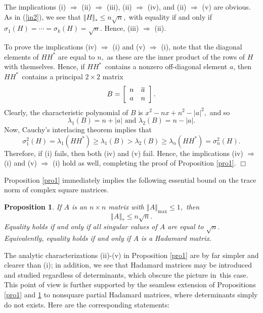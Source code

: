 \documentclass[12pt]{article}%
\newtheorem{proposition}[theorem]{Proposition}
\newenvironment{proof}[1][Proof]{\noindent{\textbf {#1}  }}  {\hfill$\Box$\bigskip}
\begin{document}
\begin{proof}
The implications (i) $\Rightarrow$ (ii) $\Rightarrow$ (iii), (ii)
$\Rightarrow$ (iv), and (ii) $\Rightarrow$ (v) are obvious. As in (\ref{in2}),
we see that $\left\Vert H\right\Vert _{\ast}\leq n\sqrt{n},$ with equality if
and only if $\sigma_{1}\left(  H\right)  =\cdots=\sigma_{k}\left(  H\right)
=\sqrt{n}.$ Hence, (iii) $\Rightarrow$ (ii).

To prove the implications (iv) $\Rightarrow$ (i) and (v) $\Rightarrow$ (i),
note that the diagonal elements of $HH^{\ast}$ are equal to $n,$ as these are
the inner product of the rows of $H$ with themselves. Hence, if $HH^{\ast
\text{ }}$contains a nonzero off-diagonal element $a$, then $HH^{\ast\text{ }%
}$contains a principal $2\times2$ matrix
\[
B=\left[
\begin{array}
[c]{cc}%
n & \overline{a}\\
a & n
\end{array}
\right]  .
\]
Clearly, the characteristic polynomial of $B$ is $x^{2}-nx+n^{2}-\left\vert
a\right\vert ^{2},$ and so
\[
\lambda_{1}\left(  B\right)  =n+\left\vert a\right\vert \text{ and }%
\lambda_{2}\left(  B\right)  =n-\left\vert a\right\vert .
\]
Now, Cauchy's interlacing theorem implies that
\[
\sigma_{1}^{2}\left(  H\right)  =\lambda_{1}\left(  HH^{\ast}\right)
\geq\lambda_{1}\left(  B\right)  >\lambda_{2}\left(  B\right)  \geq\lambda
_{n}\left(  HH^{\ast}\right)  =\sigma_{n}^{2}\left(  H\right)  .
\]
Therefore, if (i) fails, then both (iv) and (v) fail. Hence, the implications
(iv) $\Rightarrow$ (i) and (v) $\Rightarrow$ (i) hold as well, completing the
proof of Proposition \ref{pro1}.
\end{proof}

Proposition \ref{pro1} immediately implies the following essential bound on
the trace norm of complex square matrices.

\begin{proposition}
\label{tHad}If $A$ is an $n\times n$ matrix with $\left\Vert A\right\Vert
_{\max}\leq1,$ then%
\[
\left\Vert A\right\Vert _{\ast}\leq n\sqrt{n}.
\]
Equality holds if and only if all singular values of $A$ are equal to
$\sqrt{n}.$ Equivalently, equality holds if and only if $A$ is a Hadamard matrix.
\end{proposition}

The analytic characterizations (ii)-(v) in Proposition \ref{pro1} are by far
simpler and clearer than (i); in addition, we see that Hadamard matrices may
be introduced and studied regardless of determinants, which obscure the
picture in\ this case. This point of view is further supported by the seamless
extension of Propositions \ref{pro1} and \ref{tHad} to nonsquare partial
Hadamard matrices, where determinants simply do not exists. Here are the
corresponding statements:
\end{document}
